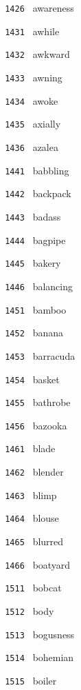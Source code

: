 \documentclass[11pt]{article}
\begin{document}
\begin{multicols}{6}
\noindent \texttt{ 1426 } awareness  \par
\vspace{3mm}
\noindent \texttt{ 1431 } awhile  \par
\noindent \texttt{ 1432 } awkward  \par
\noindent \texttt{ 1433 } awning  \par
\noindent \texttt{ 1434 } awoke  \par
\noindent \texttt{ 1435 } axially  \par
\noindent \texttt{ 1436 } azalea  \par
\vspace{3mm}
\noindent \texttt{ 1441 } babbling  \par
\noindent \texttt{ 1442 } backpack  \par
\noindent \texttt{ 1443 } badass  \par
\noindent \texttt{ 1444 } bagpipe  \par
\noindent \texttt{ 1445 } bakery  \par
\noindent \texttt{ 1446 } balancing  \par
\vspace{3mm}
\noindent \texttt{ 1451 } bamboo  \par
\noindent \texttt{ 1452 } banana  \par
\noindent \texttt{ 1453 } barracuda  \par
\noindent \texttt{ 1454 } basket  \par
\noindent \texttt{ 1455 } bathrobe  \par
\noindent \texttt{ 1456 } bazooka  \par
\vspace{3mm}
\noindent \texttt{ 1461 } blade  \par
\noindent \texttt{ 1462 } blender  \par
\noindent \texttt{ 1463 } blimp  \par
\noindent \texttt{ 1464 } blouse  \par
\noindent \texttt{ 1465 } blurred  \par
\noindent \texttt{ 1466 } boatyard  \par
\noindent \texttt{ 1511 } bobcat  \par
\noindent \texttt{ 1512 } body  \par
\noindent \texttt{ 1513 } bogusness  \par
\noindent \texttt{ 1514 } bohemian  \par
\noindent \texttt{ 1515 } boiler  \par

\end{multicols}
\end{document}
